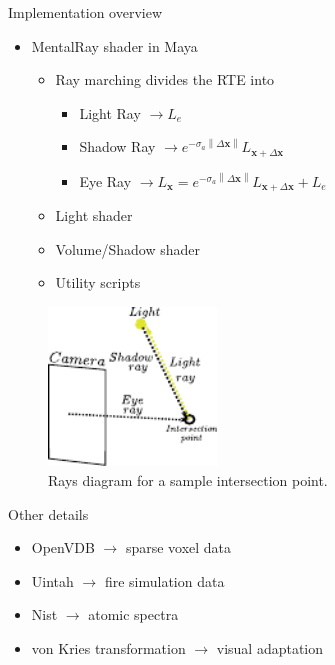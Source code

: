 \documentclass{beamer}
\newcommand{\x}{\mathbf{x}}
\newcommand{\deltax}{\left \|  \Delta \x \right \|}
\begin{document}
\begin{frame}{Implementation overview}

\begin{multicols}{2}
\begin{itemize}
\setlength\itemsep{0.5em}
\item MentalRay shader in Maya
	\begin{itemize}
	\setlength\itemsep{0.5em}
	\item Ray marching divides the RTE into
		\begin{itemize}
		\setlength\itemsep{0.5em}
		\item Light Ray $\rightarrow L_e$
		\item Shadow Ray $\rightarrow e^{-\sigma_a \deltax} L_{\x + \Delta\x}$
		\item Eye Ray $\rightarrow L_{\x} = e^{-\sigma_a \deltax} L_{\x + \Delta\x} + L_e$
		\end{itemize}
	\item Light shader
	\item Volume/Shadow shader
	\item Utility scripts		
	\end{itemize}
\end{itemize}

\begin{figure}[t!]
\begin{center}
\includegraphics[width=0.4\textwidth]{img/mental_ray_model} 
\caption*{\tiny{Rays diagram for a sample intersection point.}}
\end{center}
\end{figure}
\end{multicols}

\end{frame}

\begin{frame}{Other details}

\begin{itemize}
\setlength\itemsep{0.5em}
\item OpenVDB $\rightarrow$ sparse voxel data
\item Uintah $\rightarrow$ fire simulation data
\item Nist $\rightarrow$ atomic spectra
\item von Kries transformation $\rightarrow$ visual adaptation
\end{itemize}

\end{frame}
\end{document}
